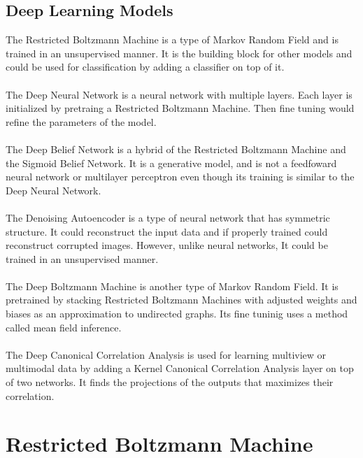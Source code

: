 \documentclass[12pt]{article}
\begin{document}
\subsection{Deep Learning Models}
The Restricted Boltzmann Machine is a type of Markov Random Field and is trained in an unsupervised manner. It is the building block for other models and could be used for classification by adding a classifier on top of it.\\
\\
The Deep Neural Network is a neural network with multiple layers. Each layer is initialized by pretraing a Restricted Boltzmann Machine. Then fine tuning would refine the parameters of the model.\\
\\
The Deep Belief Network is a hybrid of the Restricted Boltzmann Machine and the Sigmoid Belief Network. It is a generative model, and is not a feedfoward neural network or multilayer perceptron even though its training is similar to the Deep Neural Network.\\
\\
The Denoising Autoencoder is a type of neural network that has symmetric structure. It could reconstruct the input data and if properly trained could reconstruct corrupted images. However, unlike neural networks, It could be trained in an unsupervised manner.\\
\\
The Deep Boltzmann Machine is another type of Markov Random Field. It is pretrained by stacking Restricted Boltzmann Machines with adjusted weights and biases as an approximation to undirected graphs. Its fine tuninig uses a method called mean field inference.\\
\\
The Deep Canonical Correlation Analysis is used for learning multiview or multimodal data by adding a Kernel Canonical Correlation Analysis layer on top of two networks. It finds the projections of the outputs that maximizes their correlation.

\clearpage
\section{Restricted Boltzmann Machine}
\end{document}
